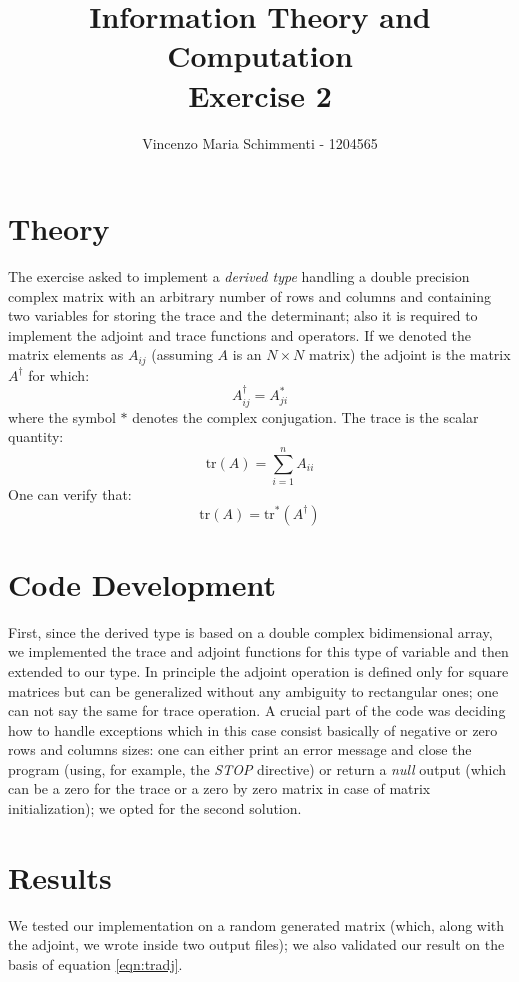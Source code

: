 \documentclass{article}
\title{%
	Information Theory and Computation \\
	Exercise  2}
\author{Vincenzo Maria Schimmenti - 1204565}
\begin{document}
\maketitle
 
\section*{Theory}
The exercise asked to implement a \textit{derived type} handling a double precision complex matrix with an arbitrary number of rows and columns and containing two variables for storing the trace and the determinant; also it is required to implement the adjoint and trace functions and operators. If we denoted the matrix elements as $A_{ij}$ (assuming $A$ is an $N \times N$ matrix) the adjoint is the matrix $A^\dagger$ for which:
\begin{equation}
	A^{\dagger}_{ij}=A^*_{ji}
\end{equation}
where the symbol $*$ denotes the complex conjugation. The trace is the scalar quantity:
\begin{equation}
	\textrm{tr}(A)=\sum_{i=1}^n A_{ii}
\end{equation}
One can verify that:
\begin{equation}
\label{eqn:tradj}
	\textrm{tr}(A)=\textrm{tr}^*(A^\dagger)
\end{equation}
\section*{Code Development}
First, since the derived type is based on a double complex bidimensional array, we implemented the trace and adjoint functions for this type of variable and then extended to our type. In principle the adjoint operation is defined only for square matrices but can be generalized without any ambiguity to rectangular ones; one can not say the same for trace operation. A crucial part of the code was deciding how to handle exceptions which in this case consist basically of negative or zero rows and columns sizes: one can either print an error message and close the program (using, for example, the \textit{STOP} directive) or return a \textit{null} output (which can be a zero for the trace or a zero by zero matrix in case of matrix initialization); we opted for the second solution.
\section*{Results}
We tested our implementation on a random generated matrix (which, along with the adjoint, we wrote inside two output files); we also validated our result on the basis of equation \ref{eqn:tradj}.
\end{document}
